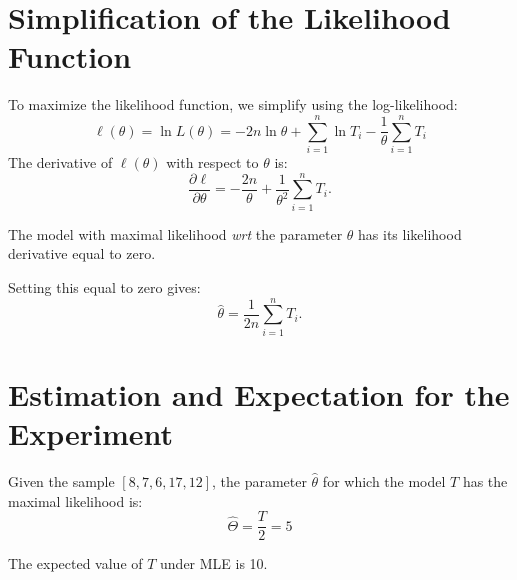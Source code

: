 \section{Simplification of the Likelihood Function}
To maximize the likelihood function, we simplify using the log-likelihood:
\begin{equation}
\ell(\theta) = \ln L(\theta) = -2n \ln \theta + \sum_{i=1}^{n} \ln T_{i} - \frac{1}{\theta} \sum_{i=1}^n T_i
\end{equation}
The derivative of $ \ell(\theta) $ with respect to $ \theta $ is:
\begin{equation}
\frac{\partial \ell}{\partial \theta} = -\frac{2n}{\theta} + \frac{1}{\theta^2} \sum_{i=1}^n T_i.
\end{equation}

The model with maximal likelihood \emph{wrt} the parameter $\theta$ has its likelihood derivative equal to zero.

Setting this equal to zero gives:
\begin{equation}
\hat{\theta} = \frac{1}{2n} \sum_{i=1}^n T_i.
\end{equation}

\section{Estimation and Expectation for the Experiment}
Given the sample $ [8, 7, 6, 17, 12] $, the parameter $\hat{\theta}$ for which the model $T$ has the maximal likelihood is:
\begin{equation*}
    \hat{\Theta}=\frac{T}{2} = 5
\end{equation*}

The expected value of $ T $ under MLE is 10.

